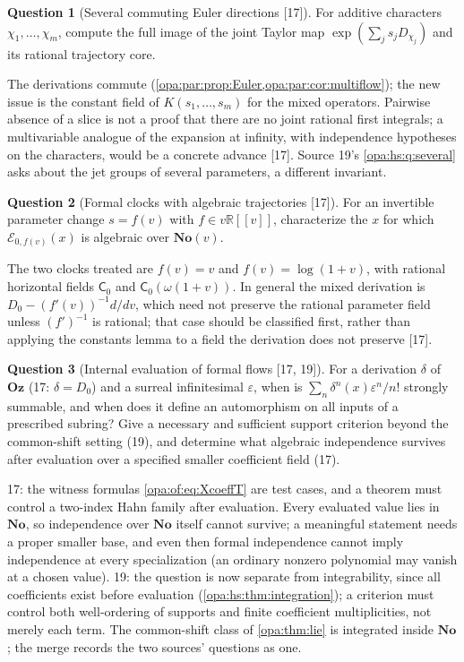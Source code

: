 \documentclass[11pt,oneside]{article}
\numberwithin{equation}{section}
\theoremstyle{definition}
\newtheorem{question}[question]{Question}
\theoremstyle{remark}
\newcommand{\No}{\mathbf{No}}
\newcommand{\Oz}{\mathbf{Oz}}
\newcommand{\R}{\mathbb R}
\newcommand{\EE}{\mathcal E}
\newcommand{\src}[1]{\textup{\textsf{\small[#1]}}}
\begin{document}
\begin{question}[Several commuting Euler directions \src{17}]\label{opa:of:q:several}
For additive characters $\chi_1,\dots,\chi_m$, compute the full image of the joint Taylor map $\exp(\sum_js_jD_{\chi_j})$ and its
rational trajectory core.
\end{question}
The derivations commute (\cref{opa:par:prop:Euler,opa:par:cor:multiflow}); the new issue is the constant field of
$K(s_1,\dots,s_m)$ for the mixed operators. Pairwise absence of a slice is not a proof that there are no joint rational first
integrals; a multivariable analogue of the expansion at infinity, with independence hypotheses on the characters, would be a
concrete advance \src{17}. Source 19's \cref{opa:hs:q:several} asks about the jet groups of several parameters, a different
invariant.

\begin{question}[Formal clocks with algebraic trajectories \src{17}]\label{opa:of:q:clocks}
For an invertible parameter change $s=f(v)$ with $f\in v\R[[v]]$, characterize the $x$ for which $\EE_{0,f(v)}(x)$ is algebraic over
$\No(v)$.
\end{question}
The two clocks treated are $f(v)=v$ and $f(v)=\log(1+v)$, with rational horizontal fields $\mathsf C_0$ and $\mathsf C_0(\omega(1+v))$.
In general the mixed derivation is $D_0-(f'(v))^{-1}d/dv$, which need not preserve the rational parameter field unless $(f')^{-1}$
is rational; that case should be classified first, rather than applying the constants lemma to a field the derivation does not
preserve \src{17}.

\begin{question}[Internal evaluation of formal flows \src{17, 19}]\label{opa:of:q:evaluation}
For a derivation $\delta$ of $\Oz$ (17: $\delta=D_0$) and a surreal infinitesimal $\varepsilon$, when is
$\sum_n\delta^n(x)\varepsilon^n/n!$ strongly summable, and when does it define an automorphism on all inputs of a prescribed
subring? Give a necessary and sufficient support criterion beyond the common-shift setting (19), and determine what algebraic
independence survives after evaluation over a specified smaller coefficient field (17).
\end{question}
17: the witness formulas \eqref{opa:of:eq:XcoeffT} are test cases, and a theorem must control a two-index Hahn family after
evaluation. Every evaluated value lies in $\No$, so independence over $\No$ itself cannot survive; a meaningful statement needs a
proper smaller base, and even then formal independence cannot imply independence at every specialization (an ordinary nonzero
polynomial may vanish at a chosen value). 19: the question is now separate from integrability, since all coefficients exist
before evaluation (\cref{opa:hs:thm:integration}); a criterion must control both well-ordering of supports and finite coefficient
multiplicities, not merely each term. The common-shift class of \cref{opa:thm:lie} is integrated inside $\No$; the merge records
the two sources' questions as one.
\end{document}
